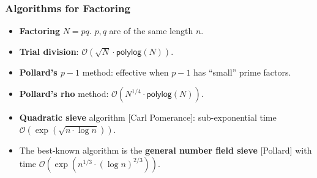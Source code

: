 \begin{frame}\frametitle{Algorithms for Factoring}
\begin{itemize}
\item \textbf{Factoring} $N=pq$. $p,q$ are of the same length $n$.
\item \textbf{Trial division}: $\mathcal{O}(\sqrt{N}\cdot \mathsf{polylog}(N))$.
\item \textbf{Pollard's $p-1$} method: effective when $p-1$ has ``small'' prime factors.
\item \textbf{Pollard's rho} method: $\mathcal{O}(N^{1/4}\cdot \mathsf{polylog}(N))$.
\item \textbf{Quadratic sieve} algorithm [Carl Pomerance]: sub-exponential time $\mathcal{O}(\exp(\sqrt{n\cdot \log n}))$.
\item The best-known algorithm is the \textbf{general number field sieve} [Pollard] with time $\mathcal{O}(\exp(n^{1/3}\cdot(\log n)^{2/3}))$.
\end{itemize}
\end{frame}
